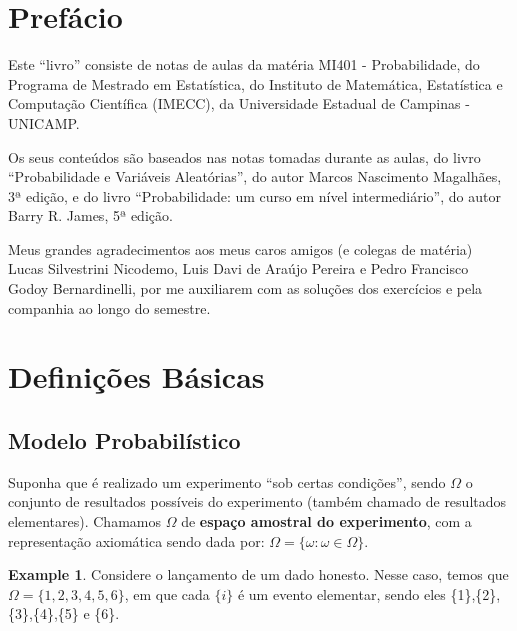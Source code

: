 \documentclass[
]{article}
\theoremstyle{definition}
\theoremstyle{definition}
\newtheorem{example}{Example}[section]
\theoremstyle{definition}
\theoremstyle{definition}
\theoremstyle{remark}
\begin{document}
\cleardoublepage

\renewcommand*\contentsname{Conteúdos}
{
\setcounter{tocdepth}{2}
\tableofcontents
}
\newpage

\hypertarget{prefuxe1cio}{%
\section{Prefácio}\label{prefuxe1cio}}

Este ``livro'' consiste de notas de aulas da matéria MI401 - Probabilidade, do Programa de Mestrado em Estatística, do Instituto de Matemática, Estatística e Computação Científica (IMECC), da Universidade Estadual de Campinas - UNICAMP.

Os seus conteúdos são baseados nas notas tomadas durante as aulas, do livro ``Probabilidade e Variáveis Aleatórias'', do autor Marcos Nascimento Magalhães, 3ª edição, e do livro ``Probabilidade: um curso em nível intermediário'', do autor Barry R. James, 5ª edição.

Meus grandes agradecimentos aos meus caros amigos (e colegas de matéria) Lucas Silvestrini Nicodemo, Luis Davi de Araújo Pereira e Pedro Francisco Godoy Bernardinelli, por me auxiliarem com as soluções dos exercícios e pela companhia ao longo do semestre.

\newpage

\hypertarget{definiuxe7uxf5es-buxe1sicas}{%
\section{Definições Básicas}\label{definiuxe7uxf5es-buxe1sicas}}

\hypertarget{modelo-probabiluxedstico}{%
\subsection{Modelo Probabilístico}\label{modelo-probabiluxedstico}}

Suponha que é realizado um experimento ``sob certas condições'', sendo \textbf{\(\Omega\)} o conjunto de resultados possíveis do experimento (também chamado de resultados elementares). Chamamos \textbf{\(\Omega\)} de \textbf{espaço amostral do experimento}, com a representação axiomática sendo dada por: \(\Omega = \{\omega : \omega \in \Omega\}\).

\begin{example}
Considere o lançamento de um dado honesto. Nesse caso, temos que \(\Omega = \{1,2,3,4,5,6\}\), em que cada \(\{i\}\) é um evento elementar, sendo eles \{1\},\{2\},\{3\},\{4\},\{5\} e \{6\}.
\end{example}
\end{document}
